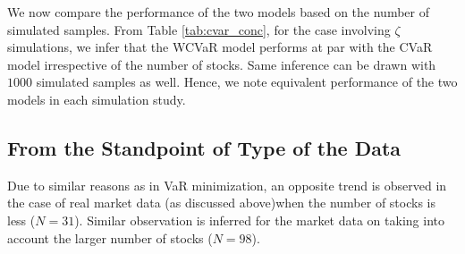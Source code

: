 We now compare the performance of the two models based on the number of simulated samples. From Table \ref{tab:cvar_conc}, for the case involving $\zeta$ simulations, we infer that the WCVaR model performs at par with the CVaR model irrespective of the number of stocks. Same inference can be drawn with $1000$ simulated samples as well. Hence, we note equivalent performance of the two models in each simulation study.

\subsection{From the Standpoint of Type of the Data}

Due to similar reasons as in VaR minimization, an opposite trend is observed in the case of real market data (as discussed above)when the number of stocks is less ($N=31$). Similar observation is inferred for the market data on taking into account the larger number of stocks ($N=98$). 






